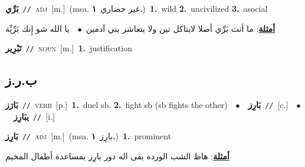 \documentclass[10pt,a4paper,twoside]{article} %
\begin{document}
\begin{multicols}{2}
{\setlength\topsep{0pt}\textbf{\foreignlanguage{arabic}{بَرِّي}}\ {\color{gray}\texttt{//}\color{black}}\ \textsc{adj}\ [m.]\ \color{gray}(msa. \foreignlanguage{arabic}{غير حضاري}~\foreignlanguage{arabic}{\textbf{١.}})\color{black}\ \textbf{1.}~wild  \textbf{2.}~uncivilized  \textbf{3.}~asocial\  \begin{flushright}\color{gray}\foreignlanguage{arabic}{\textbf{\underline{\foreignlanguage{arabic}{أمثلة}}}: ما أنت بَرِّي أصلا لابتاكل تين ولا بتعاشر بني آدمين\ $\bullet$\ \  يا الله شو إِنك بَرِّيِّة}\end{flushright}\color{black}} \vspace{2mm}

{\setlength\topsep{0pt}\textbf{\foreignlanguage{arabic}{تَبْرِير}}\ {\color{gray}\texttt{//}\color{black}}\ \textsc{noun}\ [m.]\ \textbf{1.}~justification\ } \vspace{2mm}

\vspace{-3mm}
\subsection*{\color{blue}\foreignlanguage{arabic}{ب.ر.ز}\color{blue}{}} 

{\setlength\topsep{0pt}\textbf{\foreignlanguage{arabic}{بَارَز}}\ {\color{gray}\texttt{//}\color{black}}\ \textsc{verb}\ [p.]\ \textbf{1.}~duel sb.  \textbf{2.}~fight sb (sb fights the other)\ \ $\bullet$\ \ \setlength\topsep{0pt}\textbf{\foreignlanguage{arabic}{بَارِز}}\ {\color{gray}\texttt{//}\color{black}}\ [c.]\ \ $\bullet$\ \ \setlength\topsep{0pt}\textbf{\foreignlanguage{arabic}{يبَارِز}}\ {\color{gray}\texttt{//}\color{black}}\ [i.]\ } \vspace{2mm}

{\setlength\topsep{0pt}\textbf{\foreignlanguage{arabic}{بَارِز}}\ {\color{gray}\texttt{//}\color{black}}\ \textsc{adj}\ [m.]\ \color{gray}(msa. \foreignlanguage{arabic}{بارِز}~\foreignlanguage{arabic}{\textbf{١.}})\color{black}\ \textbf{1.}~prominent\  \begin{flushright}\color{gray}\foreignlanguage{arabic}{\textbf{\underline{\foreignlanguage{arabic}{أمثلة}}}: هاظ الشب الورده بقى اله دور بارِز بمساعدة أطفال المخيم}\end{flushright}\color{black}} \vspace{2mm}


\end{multicols}
\end{document}
